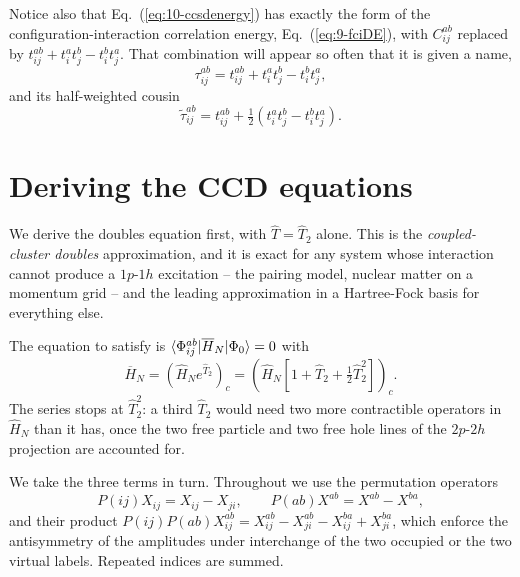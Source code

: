 Notice also that Eq.~(\ref{eq:10-ccsdenergy}) has exactly the form of the
configuration-interaction correlation energy, Eq.~(\ref{eq:9-fciDE}), with
$C_{ij}^{ab}$ replaced by $t_{ij}^{ab}+t_i^at_j^b-t_i^bt_j^a$.  That
combination will appear so often that it is given a name,
\begin{equation}
  \tau_{ij}^{ab} = t_{ij}^{ab} + t_i^at_j^b - t_i^bt_j^a,
  \label{eq:10-tau}
\end{equation}
and its half-weighted cousin
\begin{equation}
  \tilde{\tau}_{ij}^{ab} = t_{ij}^{ab}
    + \tfrac12\left(t_i^at_j^b - t_i^bt_j^a\right).
  \label{eq:10-tautilde}
\end{equation}

\section{Deriving the CCD equations}
\label{sec:ccdderivation}

We derive the doubles equation first, with $\hat{T}=\hat{T}_2$ alone.  This is
the \emph{coupled-cluster doubles} approximation, and it is exact for any
system whose interaction cannot produce a $1p$-$1h$ excitation -- the pairing
model, nuclear matter on a momentum grid -- and the leading approximation in
a Hartree-Fock basis for everything else.

The equation to satisfy is
$\langle \Phi_{ij}^{ab} | \overline{H}_N | \Phi_0 \rangle=0$ with
\begin{equation}
  \overline{H}_N = \left(\hat{H}_N e^{\hat{T}_2}\right)_c
   = \left(\hat{H}_N\left[1+\hat{T}_2
     + \tfrac12\hat{T}_2^2\right]\right)_c .
  \label{eq:10-ccdexpansion}
\end{equation}
The series stops at $\hat{T}_2^2$: a third $\hat{T}_2$ would need two more
contractible operators in $\hat{H}_N$ than it has, once the two free particle
and two free hole lines of the $2p$-$2h$ projection are accounted for.

We take the three terms in turn.  Throughout we use the permutation
operators
\begin{equation}
  P(ij)X_{ij} = X_{ij}-X_{ji},
  \qquad
  P(ab)X^{ab} = X^{ab}-X^{ba},
  \label{eq:10-permutation}
\end{equation}
and their product
$P(ij)P(ab)X_{ij}^{ab}=X_{ij}^{ab}-X_{ji}^{ab}-X_{ij}^{ba}+X_{ji}^{ba}$,
which enforce the antisymmetry of the amplitudes under interchange of the
two occupied or the two virtual labels.  Repeated indices are summed.

